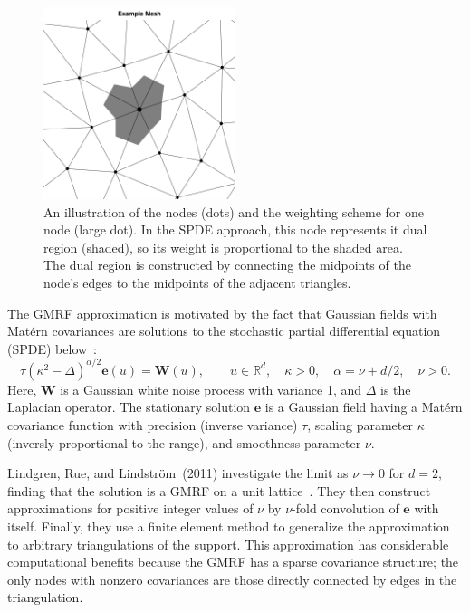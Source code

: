 \documentclass[]{interact}
\begin{document}
\begin{figure}[p]\centering
\includegraphics[width=0.5\textwidth]{figures/dual.pdf}
\caption{An illustration of the nodes (dots) and the weighting scheme for one
node (large dot). In the SPDE approach, this node represents it dual region
(shaded), so its weight is proportional to the shaded area. The dual region is
constructed by connecting the midpoints of the node's edges to the midpoints
of the adjacent triangles.}
\label{dual}
\end{figure}

The GMRF approximation is motivated by the fact that Gaussian fields with
Mat\'{e}rn covariances are solutions to the stochastic partial differential
equation (SPDE) below~\cite{lindgrenetal}:
\begin{displaymath}
\tau(\kappa^{2} - \Delta)^{\alpha / 2} \mathbf{e}(u) = \mathbf{W}(u),
\qquad u \in \mathbb{R}^d, \quad \kappa > 0,
\quad \alpha = \nu + d/2, \quad \nu > 0.
\end{displaymath}
Here, \(\mathbf{W}\) is a Gaussian white noise process with variance 1, and
\(\Delta\) is the Laplacian operator. The stationary solution
\(\mathbf{e}\) is a Gaussian field having a Mat\'{e}rn covariance
function with precision (inverse variance) \(\tau\),  scaling parameter
\(\kappa\) (inversly proportional to the range), and smoothness parameter
\(\nu\).

Lindgren, Rue, and Lindstr\"{o}m~(2011) investigate the limit as \(\nu \to 0\) for
\(d = 2\), finding that the solution is a GMRF on a unit
lattice~\cite{lindgrenetal}. They then construct approximations for positive
integer values of \(\nu\) by \(\nu\)-fold convolution of \(\mathbf{e}\)
with itself. Finally, they use a finite element method to generalize the
approximation to arbitrary triangulations of the support. This approximation
has considerable computational benefits because the GMRF has a sparse
covariance structure; the only nodes with nonzero covariances are those
directly connected by edges in the triangulation.
\end{document}
